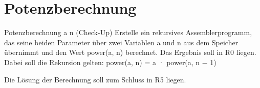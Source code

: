 \documentclass{lehramt-informatik-aufgabe}
\begin{document}
\section{Potenzberechnung}

Potenzberechnung a n (Check-Up)
Erstelle ein rekursives Assemblerprogramm, das seine beiden Parameter über zwei
Variablen a und n aus dem Speicher übernimmt und den Wert power(a, n) berechnet.
Das Ergebnis soll in R0 liegen. Dabei soll die Rekursion gelten:
power(a, n) = a · power(a, n − 1)

Die Lösung der Berechnung soll zum Schluss in R5 liegen.

\end{document}
